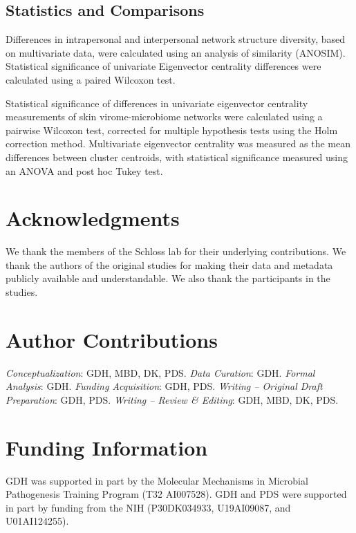 \documentclass[12pt,]{article}
\begin{document}
\subsection{Statistics and
Comparisons}\label{statistics-and-comparisons}

Differences in intrapersonal and interpersonal network structure
diversity, based on multivariate data, were calculated using an analysis
of similarity (ANOSIM). Statistical significance of univariate
Eigenvector centrality differences were calculated using a paired
Wilcoxon test.

Statistical significance of differences in univariate eigenvector
centrality measurements of skin virome-microbiome networks were
calculated using a pairwise Wilcoxon test, corrected for multiple
hypothesis tests using the Holm correction method. Multivariate
eigenvector centrality was measured as the mean differences between
cluster centroids, with statistical significance measured using an ANOVA
and post hoc Tukey test.

\section{Acknowledgments}\label{acknowledgments}

We thank the members of the Schloss lab for their underlying
contributions. We thank the authors of the original studies for making
their data and metadata publicly available and understandable. We also
thank the participants in the studies.

\section{Author Contributions}\label{author-contributions}

\emph{Conceptualization}: GDH, MBD, DK, PDS. \emph{Data Curation}: GDH.
\emph{Formal Analysis}: GDH. \emph{Funding Acquisition}: GDH, PDS.
\emph{Writing -- Original Draft Preparation}: GDH, PDS. \emph{Writing --
Review \& Editing}: GDH, MBD, DK, PDS.

\section{Funding Information}\label{funding-information}

GDH was supported in part by the Molecular Mechanisms in Microbial
Pathogenesis Training Program (T32 AI007528). GDH and PDS were supported
in part by funding from the NIH (P30DK034933, U19AI09087, and
U01AI124255).
\end{document}

